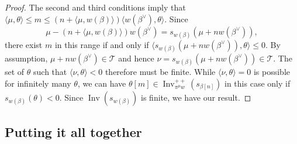 \documentclass[ALCO,ThmDefs,Unicode]{cedram}
\DeclareMathOperator{\Inv}{Inv}
\newcommand{\betacheck}{\beta^\vee}
\newcommand{\cT}{\mathcal{T}}
\newcommand{\TitsCone}{\cT}
\begin{document}
\begin{proof}
The second and third conditions imply that $\langle \mu, \theta \rangle \leq m \leq (n + \langle \mu, w(\beta) \rangle) \langle w(\betacheck), \theta \rangle$. Since
\begin{equation*}
\mu - (n + \langle \mu, w(\beta) \rangle) w(\betacheck) = s_{w(\beta)}(\mu + n w(\betacheck)),
\end{equation*}
there exist $m$ in this range if and only if $\langle s_{w(\beta)}(\mu + n w(\betacheck)), \theta \rangle \le 0$. By assumption, $\mu + n w(\betacheck) \in \TitsCone$ and hence $\nu = s_{w(\beta)}(\mu + n w(\betacheck)) \in \TitsCone$. The set of $\theta$ such that $\langle \nu, \theta \rangle < 0$ therefore must be finite. While $\langle \nu, \theta \rangle = 0$ is possible for infinitely many $\theta$, we can have $\theta[m] \in \Inv^{++}_{\pi^\mu w}(s_{\beta[n]})$ in this case only if $s_{w(\beta)}(\theta)<0$. Since $\Inv(s_{w(\beta)})$ is finite, we have our result.
\end{proof}

\subsection{Putting it all together}
\end{document}
